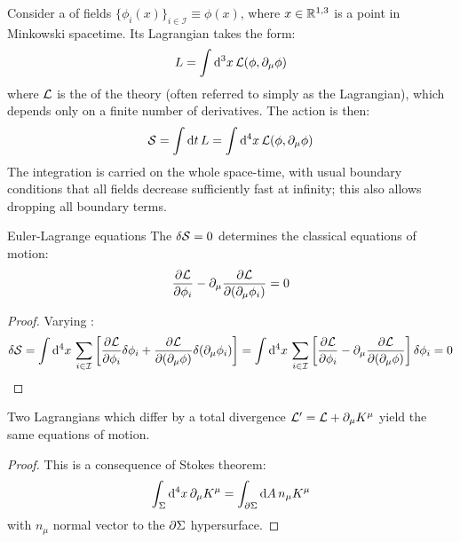 Consider a  of fields $ \{\phi_i(x)\}_{i \in \mathcal{I}} \equiv \phi(x) $, where $ x \in \mathbb{R}^{1,3} $ is a point in Minkowski spacetime. Its Lagrangian takes the form:
\begin{equation}
  L = \int \mathrm{d}^3 x\, \mathcal{L}(\phi, \partial_\mu \phi)
\end{equation}
where $ \mathcal{L} $ is the  of the theory (often referred to simply as the Lagrangian), which depends only on a finite number of derivatives. The action is then:
\begin{equation}
  \mathcal{S} = \int \mathrm{d} t\, L = \int \mathrm{d}^4 x\, \mathcal{L}(\phi, \partial_\mu \phi)
  \label{eq:def-action}
\end{equation}
The integration is carried on the whole space-time, with usual boundary conditions that all fields decrease sufficiently fast at infinity; this also allows dropping all boundary terms.

\begin{theorem}{Euler-Lagrange equations}{}
  The  $ \delta \mathcal{S} = 0 $ determines the classical equations of motion:
  \begin{equation}
    \frac{\partial \mathcal{L}}{\partial \phi_i} - \partial_\mu \frac{\partial \mathcal{L}}{\partial (\partial_\mu \phi_i)} = 0
  \end{equation}
\end{theorem}

\begin{proofbox}
  \begin{proof}
    Varying :
    \begin{equation*}
      \delta \mathcal{S} = \int \mathrm{d}^4 x\, \sum_{i \in \mathcal{I}} \left[ \frac{\partial \mathcal{L}}{\partial \phi_i} \delta \phi_i + \frac{\partial \mathcal{L}}{\partial (\partial_\mu \phi)} \delta (\partial_\mu \phi_i) \right] = \int \mathrm{d}^4 x\, \sum_{i \in \mathcal{I}} \left[ \frac{\partial \mathcal{L}}{\partial \phi_i} - \partial_\mu \frac{\partial \mathcal{L}}{\partial (\partial_\mu \phi)} \right] \delta \phi_i = 0
    \end{equation*}
  \end{proof}
\end{proofbox}

\begin{corollary}{}{}
  Two Lagrangians which differ by a total divergence $ \mathcal{L}' = \mathcal{L} + \partial_\mu K^\mu $ yield the same equations of motion.
\end{corollary}

\begin{proofbox}
  \begin{proof}
    This is a consequence of Stokes theorem:
    \begin{equation*}
      \int_\Sigma \mathrm{d}^4 x\, \partial_\mu K^\mu = \int_{\partial \Sigma} \mathrm{d} A\, n_\mu K^\mu
    \end{equation*}
    with $ n_\mu $ normal vector to the $ \partial \Sigma $ hypersurface.
  \end{proof}
\end{proofbox}

